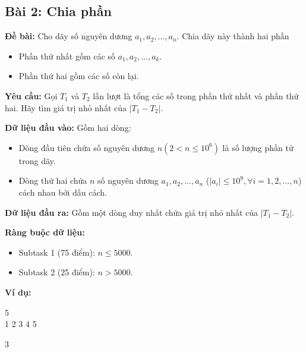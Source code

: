 \documentclass[12pt]{scrartcl}  %
\begin{document}
\subsection{Bài 2: Chia phần}
\textbf{Đề bài:}
Cho dãy số nguyên dương $a_1, a_2, ..., a_n$. Chia dãy này thành hai phần
\begin{itemize}
    \item Phần thứ nhất gồm các số $a_1, a_2, ..., a_k$.
    \item Phần thứ hai gồm các số còn lại.
\end{itemize}

\textbf{Yêu cầu:}
Gọi $T_1$ và $T_2$ lần lượt là tổng các số trong phần thứ nhất và phần thứ hai. Hãy tìm giá trị nhỏ nhất của $|T_1 - T_2|$.

\textbf{Dữ liệu đầu vào:}
Gồm hai dòng:
\begin{itemize}
    \item Dòng đầu tiên chứa số nguyên dương $n (2 < n \leq 10^6)$ là số lượng phần tử trong dãy.
    \item Dòng thứ hai chứa $n$ số nguyên dương $a_1, a_2, ..., a_n$ ($ | a_i | \le 10^9, \forall i = 1,2,...,n$) cách nhau bởi dấu cách.
\end{itemize}

\textbf{Dữ liệu đầu ra:}
Gồm một dòng duy nhất chứa giá trị nhỏ nhất của $|T_1 - T_2|$.

\textbf{Ràng buộc dữ liệu:}

\begin{itemize}
    \item Subtask 1 (75 điểm): $n \le 5000$.
    \item Subtask 2 (25 điểm): $n > 5000$.
\end{itemize}

\textbf{Ví dụ:}
\begin{tcolorbox}[colback=gray!5!white, colframe=blue!50!black, title=Input]
5\\
1 2 3 4 5
\end{tcolorbox}
\begin{tcolorbox}[colback=gray!5!white, colframe=green!50!black, title=Output]
3
\end{tcolorbox}
\end{document}

